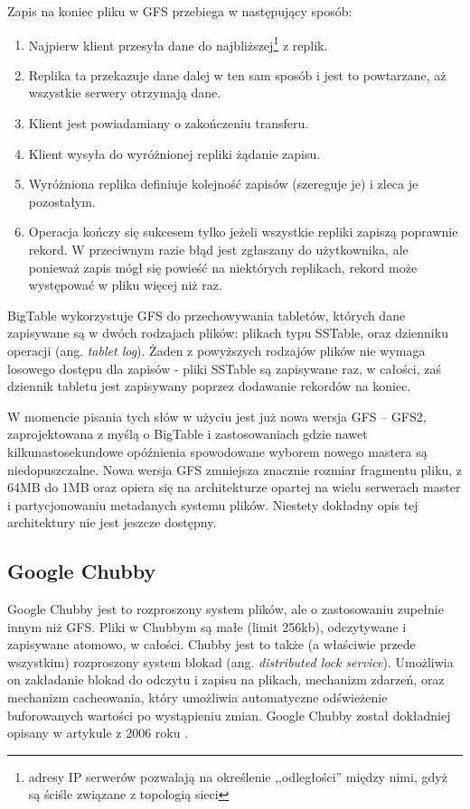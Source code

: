Zapis na koniec pliku w GFS przebiega w następujący sposób: 
\begin{enumerate}
 \item Najpierw klient przesyła dane do najbliższej\footnote{adresy IP serwerów pozwalają na określenie ,,odległości'' między nimi, gdyż są ściśle związane z topologią sieci} z replik.
 \item Replika ta przekazuje dane dalej w ten sam sposób i jest to powtarzane, aż wszystkie serwery otrzymają dane.
 \item Klient jest powiadamiany o zakończeniu transferu.
 \item Klient wysyła do wyróżnionej repliki żądanie zapisu.
 \item Wyróżniona replika definiuje kolejność zapisów (szereguje je) i zleca je pozostałym.
 \item Operacja kończy się sukcesem tylko jeżeli wszystkie repliki zapiszą poprawnie rekord.
 W przeciwnym razie błąd jest zgłaszany do użytkownika, ale ponieważ zapis mógł się powieść na niektórych replikach, rekord może występować w pliku więcej niż raz.
\end{enumerate}

BigTable wykorzystuje GFS do przechowywania tabletów, których dane zapisywane są w dwóch rodzajach plików: plikach typu SSTable, oraz dzienniku operacji (ang. \emph{tablet log}).
Żaden z powyższych rodzajów plików nie wymaga losowego dostępu dla zapisów - pliki SSTable są zapisywane raz, w całości, zaś dziennik tabletu jest zapisywany poprzez dodawanie rekordów na koniec.

W momencie pisania tych słów w użyciu jest już nowa wersja GFS -- GFS2, zaprojektowana z myślą o BigTable i zastosowaniach gdzie nawet kilkunastosekundowe opóźnienia spowodowane wyborem nowego mastera są niedopuszczalne.
Nowa wersja GFS zmniejsza znacznie rozmiar fragmentu pliku, z 64MB do 1MB oraz opiera się na architekturze opartej na wielu serwerach master i partycjonowaniu metadanych systemu plików.
Niestety dokładny opis tej architektury nie jest jeszcze dostępny.

\subsection*{Google Chubby}

Google Chubby jest to rozproszony system plików, ale o zastosowaniu zupełnie innym niż GFS.
Pliki w Chubbym są małe (limit 256kb), odczytywane i zapisywane atomowo, w całości.
Chubby jest to także (a właściwie przede wszystkim) rozproszony system blokad (ang. \emph{distributed lock service}).
Umożliwia on zakładanie blokad do odczytu i zapisu na plikach, mechanizm zdarzeń, oraz mechanizm cacheowania, który umożliwia automatyczne odświeżenie buforowanych wartości po wystąpieniu zmian.
Google Chubby został dokładniej opisany w artykule z 2006 roku \cite{google-chubby}.


